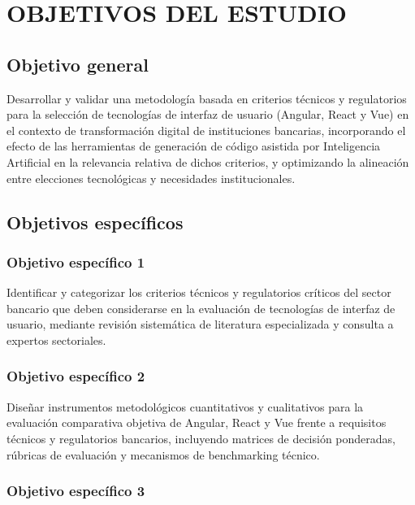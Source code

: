 \section{OBJETIVOS DEL ESTUDIO}

\subsection{Objetivo general}


Desarrollar y validar una metodología basada en criterios técnicos y
regulatorios para la selección de tecnologías de interfaz de usuario (Angular,
React y Vue) en el contexto de transformación digital de instituciones
bancarias, incorporando el efecto de las herramientas de generación de
código asistida por Inteligencia Artificial en la relevancia relativa de dichos
criterios, y optimizando la alineación entre elecciones tecnológicas y
necesidades institucionales.


\subsection{Objetivos específicos}

\subsubsection{Objetivo específico 1}

Identificar y categorizar los criterios técnicos y regulatorios críticos
        del sector bancario que deben considerarse en la evaluación de
        tecnologías de interfaz de usuario, mediante revisión sistemática de
        literatura especializada y consulta a expertos sectoriales.

\subsubsection{Objetivo específico 2}

Diseñar instrumentos metodológicos cuantitativos y cualitativos para la
        evaluación comparativa objetiva de Angular, React y Vue frente a
        requisitos técnicos y regulatorios bancarios, incluyendo matrices de
        decisión ponderadas, rúbricas de evaluación y mecanismos de
        benchmarking técnico.

\subsubsection{Objetivo específico 3}

